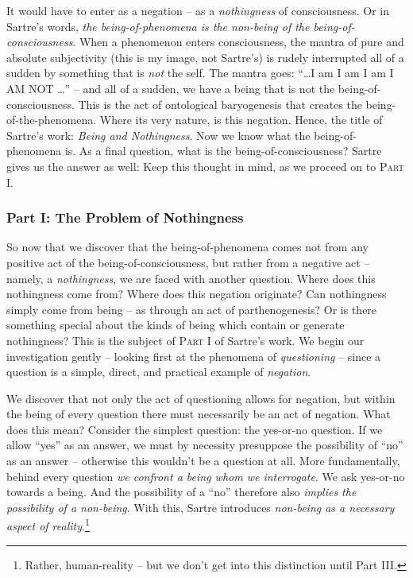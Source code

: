 It would have to enter as a negation -- as a \emph{nothingness} of consciousness. Or in Sartre's words, \emph{the being-of-phenomena is the non-being of the being-of-consciousness}. When a phenomenon enters consciousness, the mantra of pure and absolute subjectivity (this is my image, not Sartre's) is rudely interrupted all of a sudden by something that is \emph{not} the self. The mantra goes: \enquote{\ldots I am I am I am I AM NOT \ldots} -- and all of a sudden, we have a being that is not the being-of-consciousness. This is the act of ontological baryogenesis that creates the being-of-the-phenomena. Where its very nature, is this negation. Hence, the title of Sartre's work: \emph{Being and Nothingness}. Now we know what the being-of-phenomena is. As a final question, what is the being-of-consciousness? Sartre gives us the answer as well:  Keep this thought in mind, as we proceed on to \textsc{Part I}.

\subsubsection{Part I: The Problem of Nothingness}

So now that we discover that the being-of-phenomena comes not from any positive act of the being-of-consciousness, but rather from a negative act -- namely, a \emph{nothingness}, we are faced with another question. Where does this nothingness come from? Where does this negation originate? Can nothingness simply come from being -- as through an act of parthenogenesis? Or is there something special about the kinds of being which contain or generate nothingness? This is the subject of \textsc{Part I} of Sartre's work. We begin our investigation gently -- looking first at the phenomena of \emph{questioning} -- since a question is a simple, direct, and practical example of \emph{negation}. 

We discover that not only the act of questioning allows for negation, but within the being of every question there must necessarily be an act of negation. What does this mean? Consider the simplest question: the yes-or-no question. If we allow \enquote{yes} as an answer, we must by necessity presuppose the possibility of \enquote{no} as an answer -- otherwise this wouldn't be a question at all. More fundamentally, behind every question \emph{we confront a being whom we interrogate}. We ask yes-or-no towards a being. And the possibility of a \enquote{no} therefore also \emph{implies the possibility of a non-being}. With this, Sartre introduces \emph{non-being as a necessary aspect of reality}.\footnote{Rather, human-reality -- but we don't get into this distinction until Part III.}

